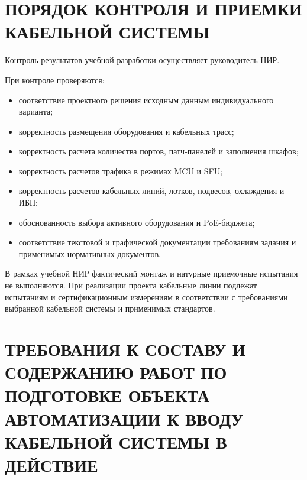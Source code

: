 \documentclass[a4paper,oneside,14pt]{extreport}
\begin{document}

\chapter{ПОРЯДОК КОНТРОЛЯ И ПРИЕМКИ КАБЕЛЬНОЙ СИСТЕМЫ}

Контроль результатов учебной разработки осуществляет руководитель НИР.

При контроле проверяются:

\begin{itemize}[label=\asbuk*)]
    \item соответствие проектного решения исходным данным индивидуального варианта;
    \item корректность размещения оборудования и кабельных трасс;
    \item корректность расчета количества портов, патч-панелей и заполнения шкафов;
    \item корректность расчетов трафика в режимах MCU и SFU;
    \item корректность расчетов кабельных линий, лотков, подвесов, охлаждения и ИБП;
    \item обоснованность выбора активного оборудования и PoE-бюджета;
    \item соответствие текстовой и графической документации требованиям задания и применимых нормативных документов.
\end{itemize}

В рамках учебной НИР фактический монтаж и натурные приемочные испытания не выполняются. При реализации проекта кабельные линии подлежат испытаниям и сертификационным измерениям в соответствии с требованиями выбранной кабельной системы и применимых стандартов.


\chapter{ТРЕБОВАНИЯ К СОСТАВУ И СОДЕРЖАНИЮ РАБОТ ПО ПОДГОТОВКЕ ОБЪЕКТА АВТОМАТИЗАЦИИ К ВВОДУ КАБЕЛЬНОЙ СИСТЕМЫ В ДЕЙСТВИЕ}
\end{document}
